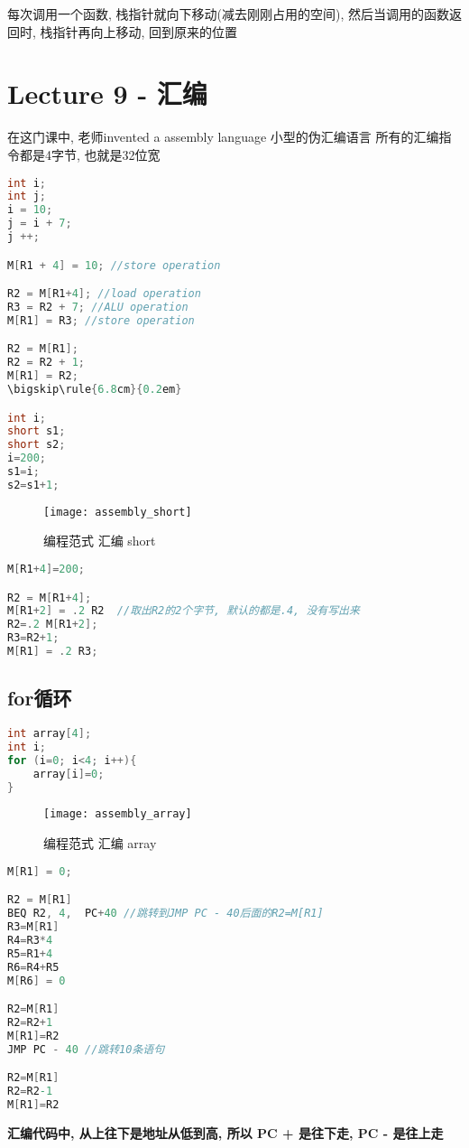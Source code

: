 \documentclass{article}
\begin{document}
每次调用一个函数, 栈指针就向下移动(减去刚刚占用的空间), 然后当调用的函数返回时, 栈指针再向上移动, 回到原来的位置

\section{Lecture 9 - 汇编}
在这门课中, 老师invented a assembly language
小型的伪汇编语言
所有的汇编指令都是4字节, 也就是32位宽

\begin{lstlisting}[language = C]
int i;
int j;
i = 10;
j = i + 7;
j ++;

M[R1 + 4] = 10; //store operation

R2 = M[R1+4]; //load operation
R3 = R2 + 7; //ALU operation
M[R1] = R3; //store operation

R2 = M[R1];
R2 = R2 + 1;
M[R1] = R2;
\bigskip\rule{6.8cm}{0.2em}

int i;
short s1;
short s2;
i=200;
s1=i;
s2=s1+1;
\end{lstlisting}
\begin{figure}[htbp]
	\centering
	\texttt{[image: assembly\_short]}\\
	\caption{编程范式 汇编 short}\label{fig.assembly.short}
\end{figure}


\begin{lstlisting}[language = C]
M[R1+4]=200;

R2 = M[R1+4];
M[R1+2] = .2 R2  //取出R2的2个字节, 默认的都是.4, 没有写出来
R2=.2 M[R1+2];
R3=R2+1;
M[R1] = .2 R3;
\end{lstlisting}

\subsection{for循环}
\begin{lstlisting}[language = C]
int array[4];
int i;
for (i=0; i<4; i++){
	array[i]=0;
}
\end{lstlisting}
\begin{figure}[htbp]
	\centering
	\texttt{[image: assembly\_array]}\\
	\caption{编程范式 汇编 array}\label{fig.assembly.array}
\end{figure}

\begin{lstlisting}[language = C]
M[R1] = 0;

R2 = M[R1]
BEQ R2, 4,  PC+40 //跳转到JMP PC - 40后面的R2=M[R1]
R3=M[R1]
R4=R3*4
R5=R1+4
R6=R4+R5
M[R6] = 0

R2=M[R1]
R2=R2+1
M[R1]=R2
JMP PC - 40 //跳转10条语句

R2=M[R1]
R2=R2-1
M[R1]=R2
\end{lstlisting}
\textbf{汇编代码中, 从上往下是地址从低到高, 所以 PC + 是往下走, PC - 是往上走}
\end{document}
